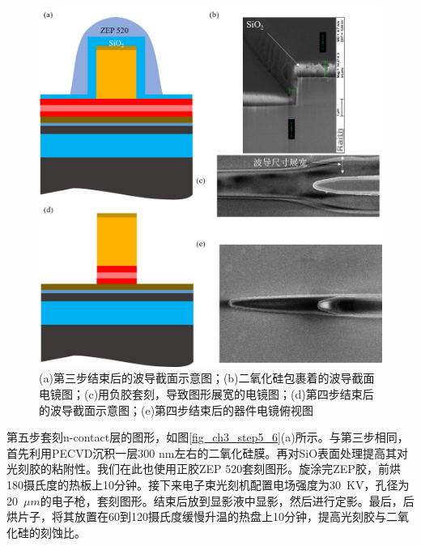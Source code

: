 \begin{figure}[htb]
	\centering
	\includegraphics[width=14cm]{./Pictures/fig_ch3_step3_4.jpg}
	\caption{(a)第三步结束后的波导截面示意图；(b)二氧化硅包裹着的波导截面电镜图；(c)用负胶套刻，导致图形展宽的电镜图；(d)第四步结束后的波导截面示意图；(e)第四步结束后的器件电镜俯视图}
	\label{fig_ch3_step3_4}
\end{figure}


第五步套刻n-contact层的图形，如图\ref{fig_ch3_step5_6}(a)所示。与第三步相同，首先利用PECVD沉积一层300 nm左右的二氧化硅膜。再对SiO表面处理提高其对光刻胶的粘附性。我们在此也使用正胶ZEP 520套刻图形。旋涂完ZEP胶，前烘180摄氏度的热板上10分钟。接下来电子束光刻机配置电场强度为30~KV，孔径为20~$\mu m$的电子枪，套刻图形。结束后放到显影液中显影，然后进行定影。最后，后烘片子，将其放置在60到120摄氏度缓慢升温的热盘上10分钟，提高光刻胶与二氧化硅的刻蚀比。

